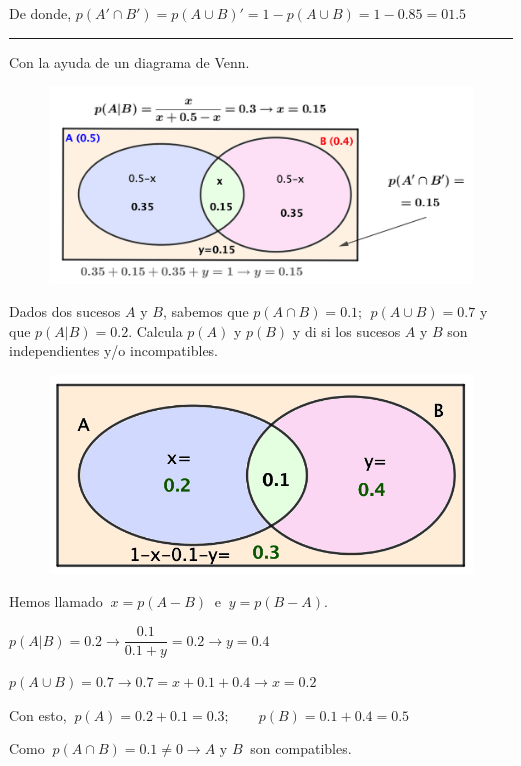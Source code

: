 De donde, $p(A'\cap B')=p(A\cup B)'=1-p(A\cup B)=1-0.85=01.5$

\vspace{-4mm} \begin{center} \textcolor{gris}{\rule{70mm}{0.1mm}} \end{center}
 
 Con la ayuda de un diagrama de Venn.
	\begin{figure}[H]
		\centering
		\includegraphics[width=.75\textwidth]{imagenes/imagenes02/T02IM41.png}
	\end{figure}

\vspace{5mm}
\begin{ejemplo}
\begin{ejer}
Dados dos sucesos $A$ y $B$, sabemos que $p(A\cap B)=0.1;\ \ p(A\cup B)=0.7$ y que $p(A|B)=0.2$. Calcula $p(A)$ y $p(B)$ y di si los sucesos $A$ y $B$ son independientes y/o incompatibles.	
\end{ejer}
\end{ejemplo}
	
	\begin{figure}[H]
		\centering
		\includegraphics[width=.6\textwidth]{imagenes/imagenes02/T02IM42.png}
	\end{figure}

Hemos llamado $\ x=p(A-B)\ $ e $\ y=p(B-A)$.

$p(A|B)=0.2 \to \dfrac{0.1}{0.1+y}=0.2 \to y=0.4$

$p(A\cup B)=0.7 \to 0.7= x+0.1+0.4 \to x=0.2$

Con esto, $\ p(A)=0.2+0.1=0.3;\qquad p(B)=0.1+0.4=0.5$

Como $\ p(A\cap B)=0.1\neq 0 \to A\text{ y } B\ $ son compatibles.

